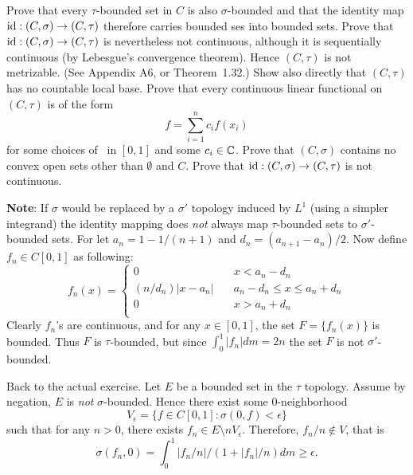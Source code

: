 \begin{enumerate}
\begin{excopy}
\begin{itemize}
  Prove that every \(\tau\)-bounded set in $C$ is also \(\sigma\)-bounded
  and that the identity map 
  \(\mathop{\rm id}\nolimits:(C,\sigma) \rightarrow (C,\tau)\) therefore carries bounded ses
  into bounded sets.
  Prove that
  \(\mathop{\rm id}\nolimits:(C,\sigma) \rightarrow (C,\tau)\) is nevertheless not continuous,
  although it is sequentially continuous (by Lebesgue's convergence theorem).
  Hence \((C,\tau)\) is not metrizable. 
  (See Appendix A6, or Theorem~1.32.) Show also directly that \((C,\tau)\)
  has no countable local base.
  Prove that every continuous linear functional on \((C,\tau)\) is of the form
  \begin{equation*}
    f = \sum_{i=1}^n c_i f(x_i)
  \end{equation*}
  for some choices of \seqxn\ in \([0,1]\) and some \(c_i\in \mathbb{C}\).
  Prove that \((C,\sigma)\) contains no convex open sets other than 
  \(\emptyset\) and $C$.
  Prove that \(\mathop{\rm id}\nolimits:(C,\sigma) \rightarrow (C,\tau)\) is not continuous.
\end{itemize}
\end{excopy}


\begin{itemize}
   \textbf{Note}: If \(\sigma\) would be replaced by a \(\sigma'\) 
   topology induced
   by \(L^1\) (using a simpler integrand) the identity mapping does \emph{not}
   always map \(\tau\)-bounded  sets to \(\sigma'\)-bounded sets.
   For let \(a_n = 1-1/(n+1)\) and \(d_n = (a_{n+1} - a_n)/2\).
   Now define \(f_n\in C[0,1]\) as following:
   \begin{equation*}
     f_n(x) = \left\{\begin{array}{ll}
                    0              & \quad x < a_n - d_n \\
                    (n/d_n)|x - a_n| & \quad a_n - d_n \leq x \leq a_n + d_n \\
                    0  & \quad x > a_n + d_n \\
                    \end{array}\right.
   \end{equation*}
   Clearly \(f_n\)'s are continuous, and for any \(x\in [0,1]\),
   the set \(F = \{f_n(x)\}\) is bounded. Thus $F$ is \(\tau\)-bounded,
   but since \(\int_0^1 |f_n|dm = 2n\) the set $F$ is not \(\sigma'\)-bounded.



   Back to the actual exercise.
   Let $E$ be a bounded set in the \(\tau\) topology.
   Assume by negation, $E$ is \emph{not} \(\sigma\)-bounded.
   Hence there exist some $0$-neighborhood 
   \begin{equation*}
   V_\epsilon = \{f\in C[0,1]: \sigma(0,f) < \epsilon\}
   \end{equation*}
   such that for any \(n > 0\), there exists \(f_n\in E \setminus nV_\epsilon\).
   Therefore, \(f_n / n \notin V\), that is
   \begin{equation} \label{eq:sigma:fn:eps}
    \sigma(f_n,0) = \int_0^1 |f_n/n|/(1 + |f_n|/n) dm 
      \geq \epsilon.
   \end{equation}
   

\end{itemize}
\end{enumerate}
